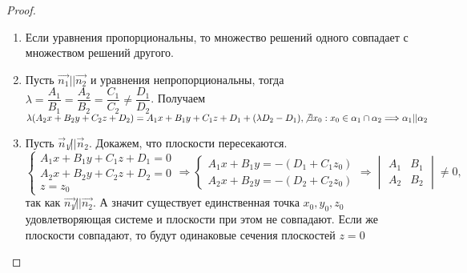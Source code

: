 \begin{proof}
	\begin{enumerate}
		\item Если уравнения пропорциональны, то множество решений одного совпадает с множеством решений другого.
		\item Пусть $\vec{n_1} || \vec{n_2}$ и уравнения непропорциональны, тогда \(\lambda = \dfrac{A_1}{B_1} = \dfrac{A_2}{B_2} = \dfrac{C_1}{C_2} \ne \dfrac{D_1}{D_2}\). Получаем \newline
		\(\lambda(A_2x+B_2y+C_2z+D_2) = A_1x+B_1y+C_1z+D_1 + (\lambda D_2 - D_1), \not\exists x_0: x_0\in \alpha_1\cap\alpha_2\Longrightarrow \alpha_1 || \alpha_2\)
		\item Пусть \(\vec n_1 \not || \vec n_2\). Докажем, что плоскости пересекаются. $\left\{
		\begin{gathered}
			A_1x+B_1y+C_1z+D_1 = 0 \\
			A_2x+B_2y+C_2z+D_2 = 0 \\ 
			z= z_0
		\end{gathered}
		\right.\Longrightarrow \left\{
		\begin{gathered}
			A_1x+B_1y = -(D_1 + C_1z_0) \\
			A_2x+B_2y = -(D_2 + C_2z_0)
		\end{gathered}
		\right.\Longrightarrow \begin{vmatrix}
			A_1 & B_1 \\
			A_2 & B_2
		\end{vmatrix}\ne 0,$ так как $\vec{n_1}\not||\vec{n_2}$. А значит существует единственная точка \(x_0, y_0, z_0\) удовлетворяющая системе и плоскости при этом не совпадают. Если же плоскости совпадают, то будут одинаковые сечения плоскостей \(z = 0\)
	\end{enumerate}
\end{proof}



